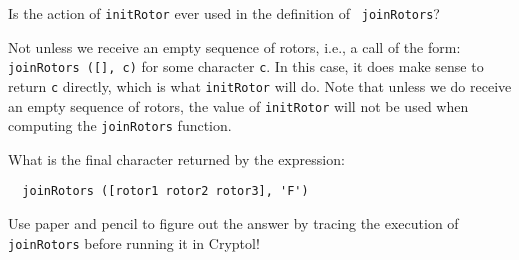 \begin{Exercise}\label{ex:enigma:4}
  Is the action of {\tt initRotor} ever used in the definition of {\tt
    joinRotors}?
\end{Exercise}
\begin{Answer}
  Not unless we receive an empty sequence of rotors, i.e., a call of
  the form: {\tt joinRotors ([], c)} for some character {\tt c}. In
  this case, it does make sense to return {\tt c} directly, which is
  what {\tt initRotor} will do. Note that unless we do receive an
  empty sequence of rotors, the value of {\tt initRotor} will not be
  used when computing the {\tt joinRotors} function.
\end{Answer}

\begin{Exercise}\label{ex:enigma:5}
What is the final character returned by the expression:
\begin{Verbatim}
  joinRotors ([rotor1 rotor2 rotor3], 'F')
\end{Verbatim}
Use paper and pencil to figure out the answer by tracing the execution
of {\tt joinRotors} before running it in Cryptol!
\end{Exercise}
